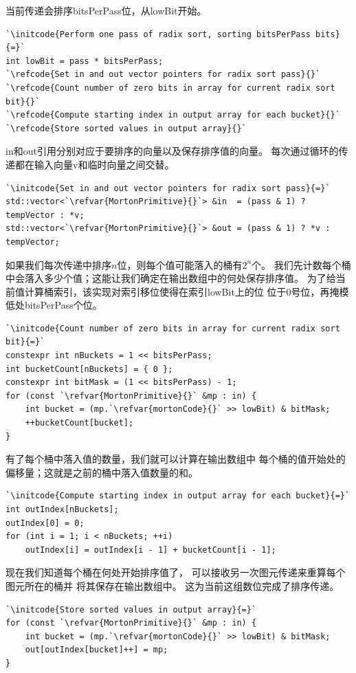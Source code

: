 当前传递会排序{\ttfamily bitsPerPass}位，从{\ttfamily lowBit}开始。
\begin{lstlisting}
`\initcode{Perform one pass of radix sort, sorting bitsPerPass bits}{=}`
int lowBit = pass * bitsPerPass;
`\refcode{Set in and out vector pointers for radix sort pass}{}`
`\refcode{Count number of zero bits in array for current radix sort bit}{}`
`\refcode{Compute starting index in output array for each bucket}{}`
`\refcode{Store sorted values in output array}{}`
\end{lstlisting}

{\ttfamily in}和{\ttfamily out}引用分别对应于要排序的向量以及保存排序值的向量。
每次通过循环的传递都在输入向量{\ttfamily *v}和临时向量之间交替。
\begin{lstlisting}
`\initcode{Set in and out vector pointers for radix sort pass}{=}`
std::vector<`\refvar{MortonPrimitive}{}`> &in  = (pass & 1) ? tempVector : *v;
std::vector<`\refvar{MortonPrimitive}{}`> &out = (pass & 1) ? *v : tempVector;
\end{lstlisting}

如果我们每次传递中排序$n$位，则每个值可能落入的桶有$2^n$个。
我们先计数每个桶中会落入多少个值；这能让我们确定在输出数组中的何处保存排序值。
为了给当前值计算桶索引，该实现对索引移位使得在索引{\ttfamily lowBit}上的位
位于0号位，再掩模低处{\ttfamily bitsPerPass}个位。
\begin{lstlisting}
`\initcode{Count number of zero bits in array for current radix sort bit}{=}`
constexpr int nBuckets = 1 << bitsPerPass;
int bucketCount[nBuckets] = { 0 };
constexpr int bitMask = (1 << bitsPerPass) - 1;
for (const `\refvar{MortonPrimitive}{}` &mp : in) {
    int bucket = (mp.`\refvar{mortonCode}{}` >> lowBit) & bitMask;
    ++bucketCount[bucket];
}
\end{lstlisting}

有了每个桶中落入值的数量，我们就可以计算在输出数组中
每个桶的值开始处的偏移量；这就是之前的桶中落入值数量的和。
\begin{lstlisting}
`\initcode{Compute starting index in output array for each bucket}{=}`
int outIndex[nBuckets];
outIndex[0] = 0;
for (int i = 1; i < nBuckets; ++i)
    outIndex[i] = outIndex[i - 1] + bucketCount[i - 1];
\end{lstlisting}

现在我们知道每个桶在何处开始排序值了，
可以接收另一次图元传递来重算每个图元所在的桶并
将其保存在输出数组中。
这为当前这组数位完成了排序传递。
\begin{lstlisting}
`\initcode{Store sorted values in output array}{=}`
for (const `\refvar{MortonPrimitive}{}` &mp : in) {
    int bucket = (mp.`\refvar{mortonCode}{}` >> lowBit) & bitMask;
    out[outIndex[bucket]++] = mp;
}
\end{lstlisting}


